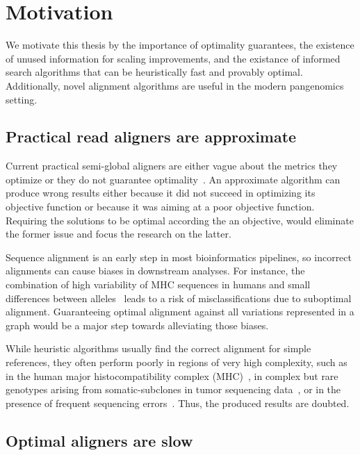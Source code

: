 \section*{Motivation}

We motivate this thesis by the importance of optimality guarantees, the
existence of unused information for scaling improvements, and the existance of
informed search algorithms that can be heuristically fast and provably optimal.
Additionally, novel alignment algorithms are useful in the modern pangenomics
setting.

\subsection*{Practical read aligners are approximate}

Current practical semi-global aligners are either vague about the metrics they
optimize or they do not guarantee optimality~\cite{alser2021technology}. An
approximate algorithm can produce wrong results either because it did not
succeed in optimizing its objective function or because it was aiming at a poor
objective function. Requiring the solutions to be optimal according the an
objective, would eliminate the former issue and focus the research on the
latter.

Sequence alignment is an early step in most bioinformatics pipelines, so
incorrect alignments can cause biases in downstream analyses. For instance, the
combination of high variability of MHC sequences in humans and small differences
between alleles~\cite{buhler_hla_2011} leads to a risk of misclassifications due
to suboptimal alignment. Guaranteeing optimal alignment against all variations
represented in a graph would be a major step towards alleviating those biases.

While heuristic algorithms usually find the correct alignment for simple
references, they often perform poorly in regions of very high complexity, such
as in the human major histocompatibility complex
(MHC)~\cite{dilthey_improved_2015}, in complex but rare genotypes arising from
somatic-subclones in tumor sequencing data~\cite{harismendy_detection_2011}, or
in the presence of frequent sequencing errors~\cite{salmela_lordec_2014}. Thus,
the produced results are doubted.

\subsection*{Optimal aligners are slow}

